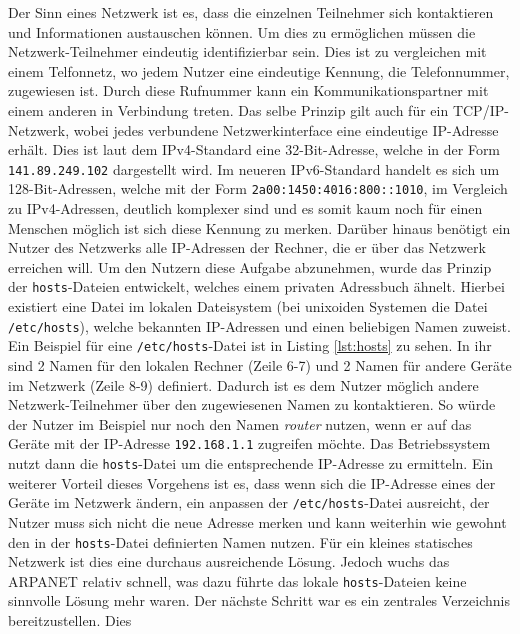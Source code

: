 \documentclass[a4paper, 12pt, BCOR10mm, DIV12, toc=bibliography, toc=listof, german]{scrbook}
\begin{document}
			Der Sinn eines Netzwerk ist es, dass die einzelnen Teilnehmer sich kontaktieren und
			Informationen austauschen können. Um dies zu ermöglichen müssen die Netzwerk-Teilnehmer
			eindeutig identifizierbar sein. Dies ist zu vergleichen mit einem Telfonnetz, wo jedem Nutzer
			eine eindeutige Kennung, die Telefonnummer, zugewiesen ist. Durch diese Rufnummer kann ein
			Kommunikationspartner mit einem anderen in Verbindung treten. Das selbe Prinzip gilt auch für
			ein TCP/IP-Netzwerk, wobei jedes verbundene Netzwerkinterface eine eindeutige IP-Adresse
			erhält. Dies ist laut dem IPv4-Standard \cite{rfc791} eine 32-Bit-Adresse, welche in der Form
			\texttt{141.89.249.102} dargestellt wird. Im neueren IPv6-Standard \cite{rfc2460} handelt es
			sich um 128-Bit-Adressen, welche mit der Form \texttt{2a00:1450:4016:800::1010}, im Vergleich
			zu IPv4-Adressen, deutlich komplexer sind und es somit kaum noch für einen Menschen möglich
			ist sich diese Kennung zu merken. Darüber hinaus benötigt ein Nutzer des Netzwerks alle
			IP-Adressen der Rechner, die er über das Netzwerk erreichen will. Um den Nutzern diese Aufgabe
			abzunehmen, wurde das Prinzip der \texttt{hosts}-Dateien entwickelt, welches einem privaten
			Adressbuch ähnelt. Hierbei existiert eine Datei im lokalen Dateisystem (bei unixoiden Systemen
			die Datei \texttt{/etc/hosts}), welche bekannten IP-Adressen und einen beliebigen Namen
			zuweist. Ein Beispiel für eine \texttt{/etc/hosts}-Datei ist in Listing \ref{lst:hosts} zu
			sehen. In ihr sind 2 Namen für den lokalen Rechner (Zeile 6-7) und 2 Namen für andere Geräte
			im Netzwerk (Zeile 8-9) definiert. Dadurch ist es dem Nutzer möglich andere
			Netzwerk-Teilnehmer über den zugewiesenen Namen zu kontaktieren. So würde der Nutzer im
			Beispiel nur noch den Namen \textit{router} nutzen, wenn er auf das Geräte mit der IP-Adresse
			\texttt{192.168.1.1} zugreifen möchte. Das Betriebssystem nutzt dann die \texttt{hosts}-Datei
			um die entsprechende IP-Adresse zu ermitteln. Ein weiterer Vorteil dieses Vorgehens ist es,
			dass wenn sich die IP-Adresse eines der Geräte im Netzwerk ändern, ein anpassen der
			\texttt{/etc/hosts}-Datei ausreicht, der Nutzer muss sich nicht die neue Adresse merken und kann
			weiterhin wie gewohnt den in der \texttt{hosts}-Datei definierten Namen nutzen. Für ein
			kleines statisches Netzwerk ist dies eine durchaus ausreichende Lösung. Jedoch wuchs das
			ARPANET relativ schnell, was dazu führte das lokale \texttt{hosts}-Dateien keine sinnvolle
			Lösung mehr waren. Der nächste Schritt war es ein zentrales Verzeichnis bereitzustellen. Dies
\end{document}

